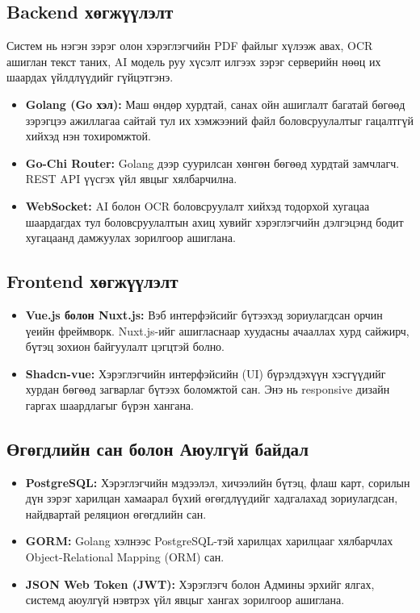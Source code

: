 \subsection{Backend хөгжүүлэлт}
Систем нь нэгэн зэрэг олон хэрэглэгчийн PDF файлыг хүлээж авах, OCR ашиглан текст таних, AI модель руу хүсэлт илгээх зэрэг серверийн нөөц их шаардах үйлдлүүдийг гүйцэтгэнэ.
\begin{itemize}
    \item \textbf{Golang (Go хэл):} Маш өндөр хурдтай, санах ойн ашиглалт багатай бөгөөд зэрэгцээ ажиллагаа сайтай тул их хэмжээний файл боловсруулалтыг гацалтгүй хийхэд нэн тохиромжтой.
    \item \textbf{Go-Chi Router:} Golang дээр суурилсан хөнгөн бөгөөд хурдтай замчлагч. REST API үүсгэх үйл явцыг хялбарчилна.
    \item \textbf{WebSocket:} AI болон OCR боловсруулалт хийхэд тодорхой хугацаа шаардагдах тул боловсруулалтын ахиц хувийг хэрэглэгчийн дэлгэцэнд бодит хугацаанд дамжуулах зорилгоор ашиглана.
\end{itemize}

\subsection{Frontend хөгжүүлэлт}
\begin{itemize}
    \item \textbf{Vue.js болон Nuxt.js:} Вэб интерфэйсийг бүтээхэд зориулагдсан орчин үеийн фреймворк. Nuxt.js-ийг ашигласнаар хуудасны ачааллах хурд сайжирч, бүтэц зохион байгуулалт цэгцтэй болно.
    \item \textbf{Shadcn-vue:} Хэрэглэгчийн интерфэйсийн (UI) бүрэлдэхүүн хэсгүүдийг хурдан бөгөөд загварлаг бүтээх боломжтой сан. Энэ нь responsive дизайн гаргах шаардлагыг бүрэн хангана.
\end{itemize}

\subsection{Өгөгдлийн сан болон Аюулгүй байдал}
\begin{itemize}
    \item \textbf{PostgreSQL:} Хэрэглэгчийн мэдээлэл, хичээлийн бүтэц, флаш карт, сорилын дүн зэрэг харилцан хамаарал бүхий өгөгдлүүдийг хадгалахад зориулагдсан, найдвартай реляцион өгөгдлийн сан.
    \item \textbf{GORM:} Golang хэлнээс PostgreSQL-тэй харилцах харилцааг хялбарчлах Object-Relational Mapping (ORM) сан.
    \item \textbf{JSON Web Token (JWT):} Хэрэглэгч болон Админы эрхийг ялгах, системд аюулгүй нэвтрэх үйл явцыг хангах зорилгоор ашиглана. 
\end{itemize}

